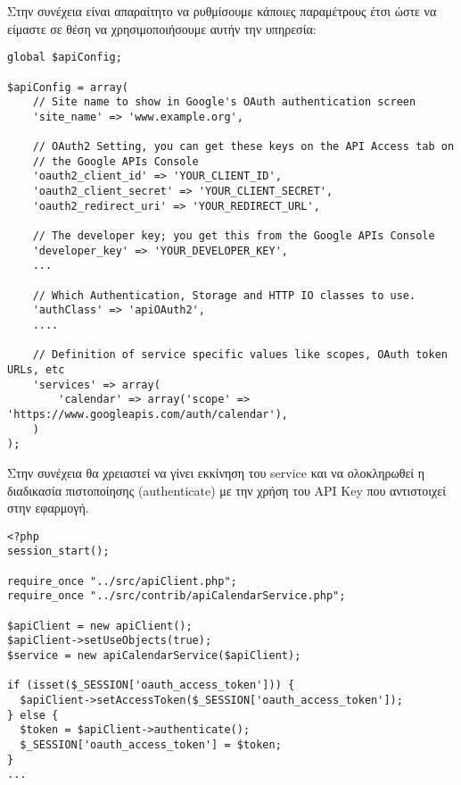 \documentclass[12pt]{article}
\begin{document}
Στην συνέχεια είναι απαραίτητο να ρυθμίσουμε κάποιες παραμέτρους έτσι ώστε να είμαστε σε θέση να χρησιμοποιήσουμε αυτήν την υπηρεσία:

\begin{verbatim}
global $apiConfig;

$apiConfig = array(
    // Site name to show in Google's OAuth authentication screen
    'site_name' => 'www.example.org',

    // OAuth2 Setting, you can get these keys on the API Access tab on
    // the Google APIs Console
    'oauth2_client_id' => 'YOUR_CLIENT_ID',
    'oauth2_client_secret' => 'YOUR_CLIENT_SECRET',
    'oauth2_redirect_uri' => 'YOUR_REDIRECT_URL',

    // The developer key; you get this from the Google APIs Console
    'developer_key' => 'YOUR_DEVELOPER_KEY',
    ...

    // Which Authentication, Storage and HTTP IO classes to use.
    'authClass' => 'apiOAuth2',
    ....

    // Definition of service specific values like scopes, OAuth token URLs, etc
    'services' => array(
        'calendar' => array('scope' => 'https://www.googleapis.com/auth/calendar'),
    )
);
\end{verbatim}

Στην συνέχεια θα χρειαστεί να γίνει εκκίνηση του service και να ολοκληρωθεί η διαδικασία πιστοποίησης (authenticate) με την χρήση του API Key που αντιστοιχεί στην εφαρμογή.

\begin{verbatim}
<?php
session_start();

require_once "../src/apiClient.php";
require_once "../src/contrib/apiCalendarService.php";

$apiClient = new apiClient();
$apiClient->setUseObjects(true);
$service = new apiCalendarService($apiClient);

if (isset($_SESSION['oauth_access_token'])) {
  $apiClient->setAccessToken($_SESSION['oauth_access_token']);
} else {
  $token = $apiClient->authenticate();
  $_SESSION['oauth_access_token'] = $token;
}
...
\end{verbatim}
\end{document}
